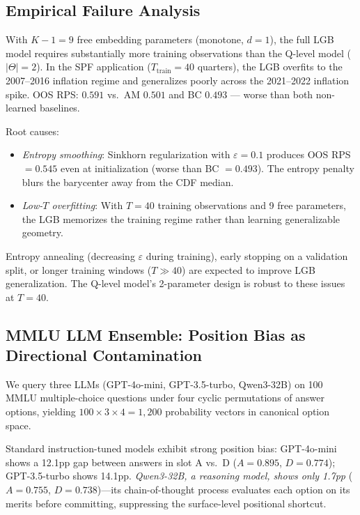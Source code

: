 \subsection*{Empirical Failure Analysis}

With $K-1 = 9$ free embedding parameters (monotone, $d=1$), the full LGB model
requires substantially more training observations than the Q-level model ($|\Theta| = 2$).
In the SPF application ($T_{\mathrm{train}} = 40$ quarters), the LGB overfits to the
2007--2016 inflation regime and generalizes poorly across the 2021--2022 inflation spike.
OOS RPS: $0.591$ vs.\ AM $0.501$ and BC $0.493$ --- worse than both non-learned baselines.

Root causes:
\begin{itemize}
\item \emph{Entropy smoothing}: Sinkhorn regularization with $\varepsilon=0.1$ produces
  OOS RPS $= 0.545$ even at initialization (worse than BC $= 0.493$).  The entropy penalty
  blurs the barycenter away from the CDF median.
\item \emph{Low-$T$ overfitting}: With $T=40$ training observations and 9 free parameters,
  the LGB memorizes the training regime rather than learning generalizable geometry.
\end{itemize}

Entropy annealing (decreasing $\varepsilon$ during training), early stopping on a validation
split, or longer training windows ($T \gg 40$) are expected to improve LGB generalization.
The Q-level model's 2-parameter design is robust to these issues at $T=40$.

\subsection*{MMLU LLM Ensemble: Position Bias as Directional Contamination}

We query three LLMs (GPT-4o-mini, GPT-3.5-turbo, Qwen3-32B) on 100 MMLU multiple-choice
questions under four cyclic permutations of answer options, yielding $100 \times 3 \times 4 =
1{,}200$ probability vectors in canonical option space.

Standard instruction-tuned models exhibit strong position bias: GPT-4o-mini shows a 12.1pp
gap between answers in slot A vs.\ D ($A=0.895$, $D=0.774$); GPT-3.5-turbo shows 14.1pp.
\emph{Qwen3-32B, a reasoning model, shows only 1.7pp} ($A=0.755$, $D=0.738$)---its
chain-of-thought process evaluates each option on its merits before committing, suppressing
the surface-level positional shortcut.

